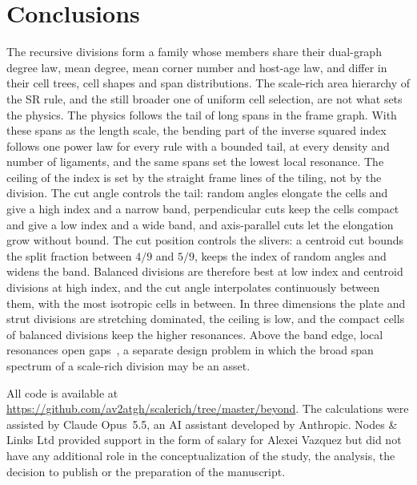 \documentclass[aps,pre,twocolumn,superscriptaddress,amsmath,amssymb,floatfix]{revtex4-2}
\begin{document}
\section{Conclusions}

The recursive divisions form a family whose members share their dual-graph degree law,
mean degree, mean corner number and host-age law, and differ in their cell trees, cell
shapes and span distributions. The scale-rich area hierarchy of the SR rule, and the
still broader one of uniform cell selection, are not what sets the physics. The physics
follows the tail of long spans in the frame graph. With these spans as the length scale,
the bending part of the inverse squared index follows one power law for every rule with a
bounded tail, at every density and number of ligaments, and the same spans set the lowest
local resonance. The ceiling of the index is set by the straight frame lines of the tiling,
not by the division. The cut angle controls the tail: random angles elongate the cells and give a high
index and a narrow band, perpendicular cuts keep the cells compact and give a low index
and a wide band, and axis-parallel cuts let the elongation grow without bound. The cut
position controls the slivers: a centroid cut bounds the split fraction between $4/9$ and
$5/9$, keeps the index of random angles and widens the band. Balanced divisions are
therefore best at low index and centroid divisions at high index, and the cut angle
interpolates continuously between them, with the most isotropic cells in between. In
three dimensions the plate and strut divisions are stretching dominated, the ceiling is
low, and the compact cells of balanced divisions keep the higher resonances. Above the band edge,
local resonances open gaps~\cite{liu2000}, a separate design problem in which the broad
span spectrum of a scale-rich division may be an asset.

\begin{acknowledgments}
All code is available at \url{https://github.com/av2atgh/scalerich/tree/master/beyond}.
The calculations were assisted by Claude Opus~5.5, an AI assistant developed by Anthropic.
Nodes \& Links Ltd provided support in the form of salary for Alexei Vazquez but did not
have any additional role in the conceptualization of the study, the analysis, the decision
to publish or the preparation of the manuscript.
\end{acknowledgments}


\end{document}
